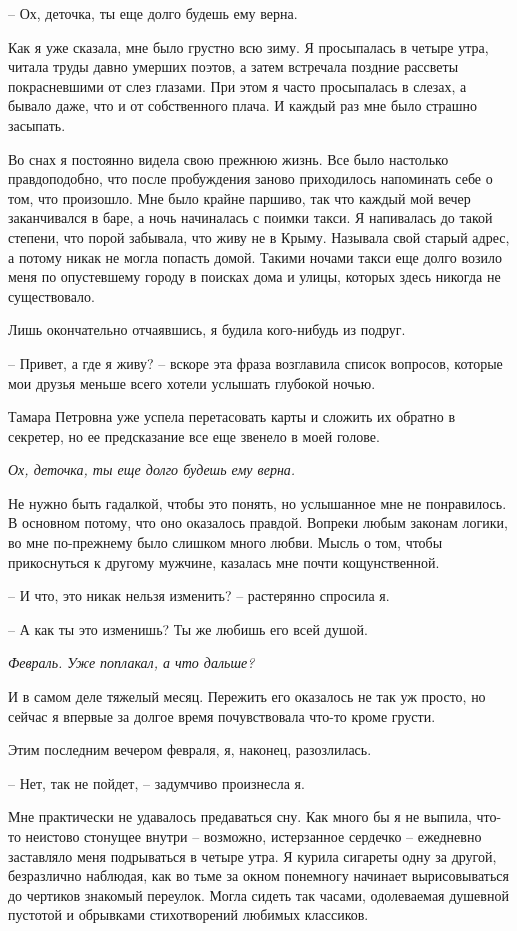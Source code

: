 \documentclass[
]{book}
\begin{document}
-- Ох, деточка, ты еще долго будешь ему верна.

Как я уже сказала, мне было грустно всю зиму. Я просыпалась в четыре утра, читала труды давно умерших поэтов, а затем встречала поздние рассветы покрасневшими от слез глазами. При этом я часто просыпалась в слезах, а бывало даже, что и от собственного плача. И каждый раз мне было страшно засыпать.

Во снах я постоянно видела свою прежнюю жизнь. Все было настолько правдоподобно, что после пробуждения заново приходилось напоминать себе о том, что произошло. Мне было крайне паршиво, так что каждый мой вечер заканчивался в баре, а ночь начиналась с поимки такси. Я напивалась до такой степени, что порой забывала, что живу не в Крыму. Называла свой старый адрес, а потому никак не могла попасть домой. Такими ночами такси еще долго возило меня по опустевшему городу в поисках дома и улицы, которых здесь никогда не существовало.

Лишь окончательно отчаявшись, я будила кого-нибудь из подруг.

-- Привет, а где я живу? -- вскоре эта фраза возглавила список вопросов, которые мои друзья меньше всего хотели услышать глубокой ночью.

Тамара Петровна уже успела перетасовать карты и сложить их обратно в секретер, но ее предсказание все еще звенело в моей голове.

\emph{Ох, деточка, ты еще долго будешь ему верна. }

Не нужно быть гадалкой, чтобы это понять, но услышанное мне не понравилось. В основном потому, что оно оказалось правдой. Вопреки любым законам логики, во мне по-прежнему было слишком много любви. Мысль о том, чтобы прикоснуться к другому мужчине, казалась мне почти кощунственной.

-- И что, это никак нельзя изменить? -- растерянно спросила я.

-- А как ты это изменишь? Ты же любишь его всей душой.

\emph{Февраль. Уже поплакал, а что дальше?}

И в самом деле тяжелый месяц. Пережить его оказалось не так уж просто, но сейчас я впервые за долгое время почувствовала что-то кроме грусти.

Этим последним вечером февраля, я, наконец, разозлилась.

-- Нет, так не пойдет, -- задумчиво произнесла я.

Мне практически не удавалось предаваться сну. Как много бы я не выпила, что-то неистово стонущее внутри -- возможно, истерзанное сердечко -- ежедневно заставляло меня подрываться в четыре утра. Я курила сигареты одну за другой, безразлично наблюдая, как во тьме за окном понемногу начинает вырисовываться до чертиков знакомый переулок. Могла сидеть так часами, одолеваемая душевной пустотой и обрывками стихотворений любимых классиков.
\end{document}
